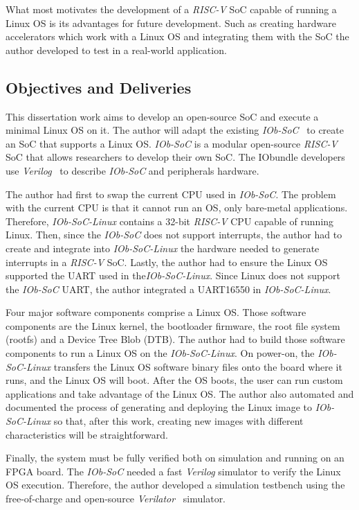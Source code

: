 What most motivates the development of a \textit{RISC-V} SoC capable of running a Linux OS is its advantages for future development. Such as creating hardware accelerators which work with a Linux OS and integrating them with the SoC the author developed to test in a real-world application.

\subsection{Objectives and Deliveries}

This dissertation work aims to develop an open-source SoC and execute a minimal Linux OS on it. The author will adapt the existing \textit{IOb-SoC}~\cite{iob_soc} to create an SoC that supports a Linux OS. \textit{IOb-SoC} is a modular open-source \textit{RISC-V} SoC that allows researchers to develop their own SoC. The IObundle developers use \textit{Verilog}~\cite{thomas2008verilog} to describe \textit{IOb-SoC} and peripherals hardware.

The author had first to swap the current CPU used in \textit{IOb-SoC}. The problem with the current CPU is that it cannot run an OS, only bare-metal applications. Therefore, \textit{IOb-SoC-Linux} contains a 32-bit \textit{RISC-V} CPU capable of running Linux. Then, since the \textit{IOb-SoC} does not support interrupts, the author had to create and integrate into \textit{IOb-SoC-Linux} the hardware needed to generate interrupts in a \textit{RISC-V} SoC. Lastly, the author had to ensure the Linux OS supported the UART used in the\textit{IOb-SoC-Linux}. Since Linux does not support the \textit{IOb-SoC} UART, the author integrated a UART16550 in \textit{IOb-SoC-Linux}.

Four major software components comprise a Linux OS. Those software components are the Linux kernel, the bootloader firmware, the root file system (rootfs) and a Device Tree Blob (DTB). The author had to build those software components to run a Linux OS on the \textit{IOb-SoC-Linux}. On power-on, the \textit{IOb-SoC-Linux} transfers the Linux OS software binary files onto the board where it runs, and the Linux OS will boot. After the OS boots, the user can run custom applications and take advantage of the Linux OS. The author also automated and documented the process of generating and deploying the Linux image to \textit{IOb-SoC-Linux} so that, after this work, creating new images with different characteristics will be straightforward.

Finally, the system must be fully verified both on simulation and running on an FPGA board. The \textit{IOb-SoC} needed a fast \textit{Verilog} simulator to verify the Linux OS execution. Therefore, the author developed a simulation testbench using the free-of-charge and open-source \textit{Verilator}~\cite{snyder2010verilator} simulator.
